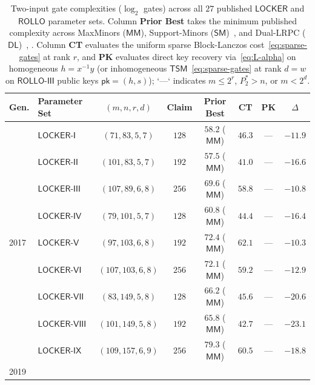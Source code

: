 \documentclass[11pt,a4paper]{article}
\theoremstyle{definition}
\theoremstyle{remark}
\newcommand{\TSM}{\mathsf{TSM}}
\begin{document}
\begin{table}[p]
\centering
\caption{Two-input gate complexities ($\log_2$ gates) across all $27$ published $\mathsf{LOCKER}$ and $\mathsf{ROLLO}$ parameter sets. Column \textbf{Prior Best} takes the minimum published complexity across MaxMinors ($\mathsf{MM}$), Support-Minors ($\mathsf{SM}$)~\cite{BBGT23,EVV26}, and Dual-LRPC ($\mathsf{DL}$)~\cite[\S6.2]{ROLLO20}, \cite{SZHW23}. Column \textbf{CT} evaluates the uniform sparse Block-Lanczos cost~\eqref{eq:sparse-gates} at rank $r$, and \textbf{PK} evaluates direct key recovery via~\eqref{eq:L-alpha} on homogeneous $h = x^{-1}y$ (or inhomogeneous $\TSM$~\eqref{eq:sparse-gates} at rank $d = w$ on $\mathsf{ROLLO\text{-}III}$ public keys $\mathsf{pk} = (h, s)$); `---` indicates $m \le 2^r$, $P_2^* > n$, or $m < 2^d$.}
\label{tab:all27}
\renewcommand{\arraystretch}{1.03}
\setlength{\tabcolsep}{4.5pt}
\begin{tabular}{@{}llcccccc@{}}
\toprule
\textbf{Gen.} & \textbf{Parameter Set} & \textbf{$(m, n, r, d)$} & \textbf{Claim} & \textbf{Prior Best} & \textbf{CT} & \textbf{PK} & \textbf{$\Delta$} \\
\midrule
\multirow{9}{*}{2017}
 & $\mathsf{LOCKER\text{-}I}$ & $(71, 83, 5, 7)$ & $128$ & $58.2$ ($\mathsf{MM}$) & $46.3$ & --- & $-11.9$ \\
 & $\mathsf{LOCKER\text{-}II}$ & $(101, 83, 5, 7)$ & $192$ & $57.5$ ($\mathsf{MM}$) & $41.0$ & --- & $-16.6$ \\
 & $\mathsf{LOCKER\text{-}III}$ & $(107, 89, 6, 8)$ & $256$ & $69.6$ ($\mathsf{MM}$) & $58.8$ & --- & $-10.8$ \\
 & $\mathsf{LOCKER\text{-}IV}$ & $(79, 101, 5, 7)$ & $128$ & $60.8$ ($\mathsf{MM}$) & $44.4$ & --- & $-16.4$ \\
 & $\mathsf{LOCKER\text{-}V}$ & $(97, 103, 6, 8)$ & $192$ & $72.4$ ($\mathsf{MM}$) & $62.1$ & --- & $-10.3$ \\
 & $\mathsf{LOCKER\text{-}VI}$ & $(107, 103, 6, 8)$ & $256$ & $72.1$ ($\mathsf{MM}$) & $59.2$ & --- & $-12.9$ \\
 & $\mathsf{LOCKER\text{-}VII}$ & $(83, 149, 5, 8)$ & $128$ & $66.2$ ($\mathsf{MM}$) & $45.6$ & --- & $-20.6$ \\
 & $\mathsf{LOCKER\text{-}VIII}$ & $(101, 149, 5, 8)$ & $192$ & $65.8$ ($\mathsf{MM}$) & $42.7$ & --- & $-23.1$ \\
 & $\mathsf{LOCKER\text{-}IX}$ & $(109, 157, 6, 9)$ & $256$ & $79.3$ ($\mathsf{MM}$) & $60.5$ & --- & $-18.8$ \\
\midrule
\multirow{9}{*}{2019}

\end{tabular}
\end{table}
\end{document}

